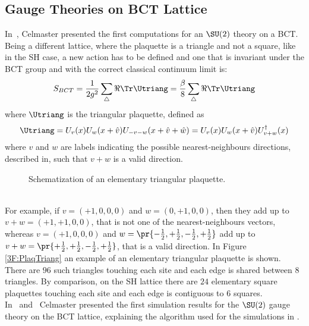 \subsection{Gauge Theories on BCT Lattice}
In~\cite{Celmaster:1982ht}, Celmaster presented the first computations for an $\SU(2)$ theory on a BCT.
Being a different lattice, where the plaquette is a triangle and not a square, like in the SH case, a new action has to be defined and one that is invariant under the BCT group and with the correct classical continuum limit is:
\begin{equation}
    S_{BCT} = \frac1{2g^2} \sum_\bigtriangleup \Re\Tr \Utriang = \frac\beta8 \sum_\bigtriangleup \Re\Tr \Utriang \label{3:BCTAction}
\end{equation}
where $\Utriang$ is the triangular plaquette, defined as
\begin{equation}
    \Utriang = U_v(x)U_w(x+\hat{v})U_{-v-w}(x+\hat{v}+\hat{w}) = U_v(x)U_w(x+\hat{v})U^\dagger_{v+w}(x) \label{3:PlaqTriang}
\end{equation}
where $v$ and $w$ are labels indicating the possible nearest-neighbours directions, described in, such that $v+w$ is a valid direction.
\begin{figure}[!hbtp]
    \centering
    \caption{Schematization of an elementary triangular plaquette.}
    \label{3F:PlaqTriang}
\end{figure}\\
For example, if $v=(+1,0,0,0)$ and $w=(0,+1,0,0)$, then they add up to $v+w=(+1,+1,0,0)$, that is not one of the nearest-neighbours vectors, whereas $v=(+1,0,0,0)$ and $w=\pr{-\frac12,+\frac12,-\frac12,+\frac12}$ add up to $v+w=\pr{+\frac12,+\frac12,-\frac12,+\frac12}$, that is a valid direction.
In Figure \eqref{3F:PlaqTriang} an example of an elementary triangular plaquette is shown.\\
There are $96$ such triangles touching each site and each edge is shared between $8$ triangles.
By comparison, on the SH lattice there are $24$ elementary square plaquettes touching each site and each edge is contiguous to $6$ squares.\\
In~\cite{Celmaster:1983hs} and~\cite{Celmaster:1983vy} Celmaster presented the first simulation results for the $\SU(2)$ gauge theory on the BCT lattice, explaining the algorithm used for the simulations in \cite{CELMASTER1985415}.

